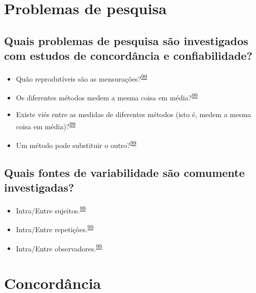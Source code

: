 \documentclass[
]{book}
\begin{document}
\hypertarget{problemas}{%
\section{Problemas de pesquisa}\label{problemas}}

\hypertarget{quais-problemas-de-pesquisa-suxe3o-investigados-com-estudos-de-concorduxe2ncia-e-confiabilidade}{%
\subsection{Quais problemas de pesquisa são investigados com estudos de concordância e confiabilidade?}\label{quais-problemas-de-pesquisa-suxe3o-investigados-com-estudos-de-concorduxe2ncia-e-confiabilidade}}

\begin{itemize}
\item
  Quão reprodutíveis são as mensurações?\textsuperscript{\protect\hyperlink{ref-altman1983}{99}}
\item
  Os diferentes métodos medem a mesma coisa em média?\textsuperscript{\protect\hyperlink{ref-altman1983}{99}}
\item
  Existe viés entre as medidas de diferentes métodos (isto é, medem a mesma coisa em média)?\textsuperscript{\protect\hyperlink{ref-altman1983}{99}}
\item
  Um método pode substituir o outro?\textsuperscript{\protect\hyperlink{ref-altman1983}{99}}
\end{itemize}

\hypertarget{quais-fontes-de-variabilidade-suxe3o-comumente-investigadas}{%
\subsection{Quais fontes de variabilidade são comumente investigadas?}\label{quais-fontes-de-variabilidade-suxe3o-comumente-investigadas}}

\begin{itemize}
\item
  Intra/Entre sujeitos.\textsuperscript{\protect\hyperlink{ref-altman1983}{99}}
\item
  Intra/Entre repetições.\textsuperscript{\protect\hyperlink{ref-altman1983}{99}}
\item
  Intra/Entre observadores.\textsuperscript{\protect\hyperlink{ref-altman1983}{99}}
\end{itemize}

\hypertarget{concordancia}{%
\section{Concordância}\label{concordancia}}
\end{document}
